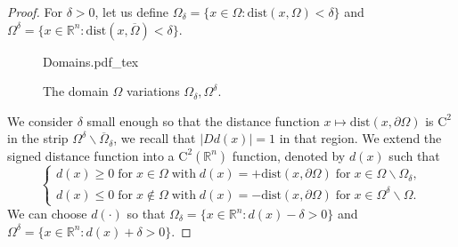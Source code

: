 \documentclass[11pt,reqno]{amsart}
\numberwithin{figure}{section}
\theoremstyle{plain}
\theoremstyle{remark}
\numberwithin{equation}{section}
\newcommand{\incfig}[1]{%
    \def\svgwidth{\columnwidth}
    {#1.pdf_tex}
}
\begin{document}
\begin{proof} For $\delta>0$, let us define $\Omega_\delta = \{x\in \Omega: \mathrm{dist}(x,\Omega) < \delta\}$ and $\Omega^\delta = \{x\in \mathbb{R}^n: \mathrm{dist}(x,\overline{\Omega}) < \delta\}$. 
\begin{figure}[ht]
    \centering
    \def\svgwidth{0.47\columnwidth}
    {Domains.pdf_tex}
    \caption{The domain $\Omega$ variations $\Omega_\delta, \Omega^\delta$.}
    \label{fig:Domains}
\end{figure}
We consider $\delta$ small enough so that the distance function $x\mapsto \mathrm{dist}(x,\partial \Omega)$ is $\mathrm{C}^2$ in the strip $\Omega^\delta\backslash \overline{\Omega}_\delta$, we recall that $|D d(x)| = 1$ in that region. We extend the signed distance function into a $\mathrm{C}^2(\mathbb{R}^n)$ function, denoted by $d(x)$ such that 
\begin{equation*}
    \begin{cases}
    d(x)\geq 0\;\text{for}\;x\in\Omega\;\text{with}\;d(x) = +\mathrm{dist}(x,\partial\Omega)\;\text{for}\;x\in \Omega\backslash \Omega_\delta,\\
    d(x)\leq 0\;\text{for}\;x\notin \Omega\;\text{with}\;d(x) = -\mathrm{dist}(x,\partial\Omega)\;\text{for}\;x\in \Omega^\delta\backslash \Omega.
    \end{cases}
\end{equation*}
We can choose $d(\cdot)$ so that $\Omega_\delta = \{x\in \mathbb{R}^n: d(x)-\delta >0 \}$ and $\Omega^\delta = \{x\in \mathbb{R}^n: d(x) +\delta>0\}$.


\end{proof}
\end{document}
